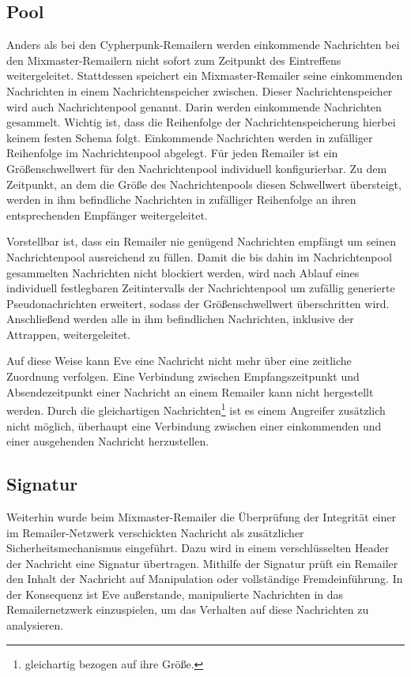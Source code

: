 \subsection{Pool}
Anders als bei den Cypherpunk-Remailern werden einkommende Nachrichten bei den Mixmaster-Remailern nicht sofort zum Zeitpunkt des Eintreffens weitergeleitet. Stattdessen speichert ein Mixmaster-Remailer seine einkommenden Nachrichten in einem Nachrichtenspeicher zwischen. Dieser Nachrichtenspeicher wird auch Nachrichtenpool genannt. Darin werden einkommende Nachrichten gesammelt. Wichtig ist, dass die Reihenfolge der Nachrichtenspeicherung hierbei keinem festen Schema folgt. Einkommende Nachrichten werden in zufälliger Reihenfolge im Nachrichtenpool abgelegt. Für jeden Remailer ist ein Größenschwellwert für den Nachrichtenpool individuell konfigurierbar. Zu dem Zeitpunkt, an dem die Größe des Nachrichtenpools diesen Schwellwert übersteigt, werden in ihm befindliche Nachrichten in zufälliger Reihenfolge an ihren entsprechenden Empfänger weitergeleitet. 

Vorstellbar ist, dass ein Remailer nie genügend Nachrichten empfängt um seinen Nachrichtenpool ausreichend zu füllen. Damit die bis dahin im Nachrichtenpool gesammelten Nachrichten nicht blockiert werden, wird nach Ablauf eines individuell festlegbaren Zeitintervalls der Nachrichtenpool um zufällig generierte Pseudonachrichten erweitert, sodass der Größenschwellwert überschritten wird. Anschließend werden alle in ihm befindlichen Nachrichten, inklusive der Attrappen, weitergeleitet. 

Auf diese Weise kann Eve eine Nachricht nicht mehr über eine zeitliche Zuordnung verfolgen. Eine Verbindung zwischen Empfangszeitpunkt und Absendezeitpunkt einer Nachricht an einem Remailer kann nicht hergestellt werden. Durch die gleichartigen Nachrichten\footnote{gleichartig bezogen auf ihre Größe.} ist es einem Angreifer zusätzlich nicht möglich, überhaupt eine Verbindung zwischen einer einkommenden und einer ausgehenden Nachricht herzustellen. 


\subsection{Signatur}
Weiterhin wurde beim Mixmaster-Remailer die Überprüfung der Integrität einer im Remailer-Netzwerk verschickten Nachricht als zusätzlicher Sicherheitsmechanismus eingeführt. Dazu wird in einem verschlüsselten Header der Nachricht eine Signatur übertragen. 
Mithilfe der Signatur prüft ein Remailer den Inhalt der Nachricht auf Manipulation oder vollständige Fremdeinführung.
In der Konsequenz ist Eve außerstande, manipulierte Nachrichten in das Remailernetzwerk einzuspielen, um das Verhalten auf diese Nachrichten zu analysieren.

